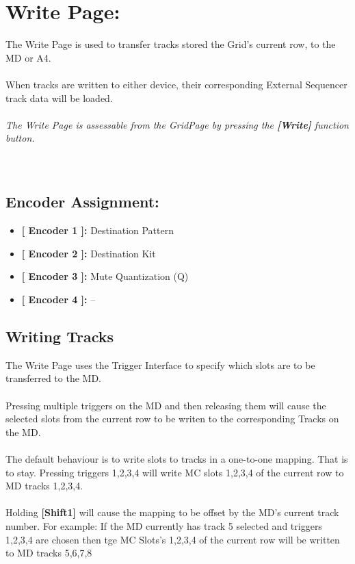 \chapter{Write Page:}

The Write Page is used to transfer tracks stored the Grid's current row, to the MD or A4.\\
\\
When tracks are written to either device, their corresponding External Sequencer track data will be loaded.
\\\\
\textit{The Write Page is assessable from the GridPage by pressing the  \textbf{[Write]} function button.}
\\\\
\\
\section{Encoder Assignment:}
\begin{itemize}
	\item \textbf{[ Encoder 1 ]: }Destination Pattern
	\item \textbf{[ Encoder 2 ]: }Destination Kit
	\item \textbf{[ Encoder 3 ]: }Mute Quantization (Q)
	\item \textbf{[ Encoder 4 ]: }--
\end{itemize}
\section{Writing Tracks}
The Write Page uses the Trigger Interface to specify which slots are to be transferred to the MD.\\
\\
Pressing multiple triggers on the MD and then releasing them will cause the selected slots from the current row to be writen to the corresponding Tracks on the MD.
\\
\\The default behaviour is to write slots to tracks in a one-to-one mapping. That is to stay. Pressing triggers 1,2,3,4 will write MC slots 1,2,3,4 of the current row to MD tracks 1,2,3,4.\\
\\
Holding  \textbf{[Shift1]} will cause the mapping to be offset by the MD's current track number. For example: If the MD currently has track 5 selected and triggers 1,2,3,4 are chosen then tge MC Slots's 1,2,3,4 of the current row will be written to MD tracks 5,6,7,8
